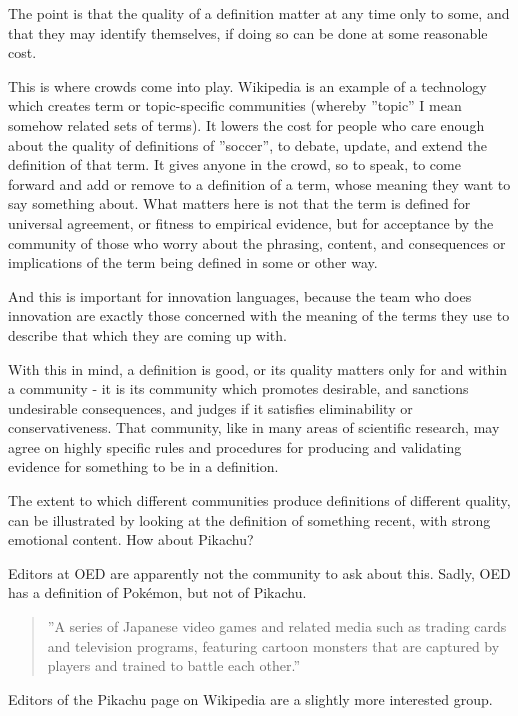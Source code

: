 \documentclass[graybox,envcountchap,sectrefs]{svmono}
\begin{document}
The point is that the quality of a definition matter at any time only to some, and that they may identify themselves, if doing so can be done at some reasonable cost. 

This is where crowds come into play. Wikipedia is an example of a technology which creates term or topic-specific communities (whereby ''topic'' I mean somehow related sets of terms). It lowers the cost for people who care enough about the quality of definitions of ''soccer'', to debate, update, and extend the definition of that term. It gives anyone in the crowd, so to speak, to come forward and add or remove to a definition of a term, whose meaning they want to say something about. What matters here is not that the term is defined for universal agreement, or fitness to empirical evidence, but for acceptance by the community of those who worry about the phrasing, content, and consequences or implications of the term being defined in some or other way.

And this is important for innovation languages, because the team who does innovation are exactly those concerned with the meaning of the terms they use to describe that which they are coming up with.

With this in mind, a definition is good, or its quality matters only for and within a community - it is its community which promotes desirable, and sanctions undesirable consequences, and judges if it satisfies eliminability or conservativeness. That community, like in many areas of scientific research, may agree on highly specific rules and procedures for producing and validating evidence for something to be in a definition.

The extent to which different communities produce definitions of different quality, can be illustrated by looking at the definition of something recent, with strong emotional content. How about Pikachu?

Editors at OED are apparently not the community to ask about this. Sadly, OED has a definition of Pok\'{e}mon, but not of Pikachu.

\begin{quote}
''A series of Japanese video games and related media such as trading cards and television programs, featuring cartoon monsters that are captured by players and trained to battle each other.'' \cite{def-pokemon}
\end{quote}

Editors of the Pikachu page on Wikipedia are a slightly more interested group.
\end{document}
